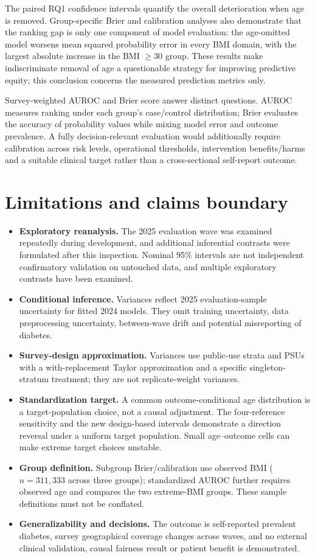 The paired RQ1 confidence intervals quantify the overall deterioration when age is removed. Group-specific Brier and calibration analyses also demonstrate that the ranking gap is only one component of model evaluation: the age-omitted model worsens mean squared probability error in every BMI domain, with the largest absolute increase in the BMI $\geq30$ group. These results make indiscriminate removal of age a questionable strategy for improving predictive equity; this conclusion concerns the measured prediction metrics only.

Survey-weighted AUROC and Brier score answer distinct questions. AUROC measures ranking under each group's case/control distribution; Brier evaluates the accuracy of probability values while mixing model error and outcome prevalence. A fully decision-relevant evaluation would additionally require calibration across risk levels, operational thresholds, intervention benefits/harms and a suitable clinical target rather than a cross-sectional self-report outcome.

\section{Limitations and claims boundary}
\begin{itemize}
\item \textbf{Exploratory reanalysis.} The 2025 evaluation wave was examined repeatedly during development, and additional inferential contrasts were formulated after this inspection. Nominal 95\% intervals are not independent confirmatory validation on untouched data, and multiple exploratory contrasts have been examined.
\item \textbf{Conditional inference.} Variances reflect 2025 evaluation-sample uncertainty for fitted 2024 models. They omit training uncertainty, data preprocessing uncertainty, between-wave drift and potential misreporting of diabetes.
\item \textbf{Survey-design approximation.} Variances use public-use strata and PSUs with a with-replacement Taylor approximation and a specific singleton-stratum treatment; they are not replicate-weight variances.
\item \textbf{Standardization target.} A common outcome-conditional age distribution is a target-population choice, not a causal adjustment. The four-reference sensitivity and the new design-based intervals demonstrate a direction reversal under a uniform target population. Small age--outcome cells can make extreme target choices unstable.
\item \textbf{Group definition.} Subgroup Brier/calibration use observed BMI ($n=311{,}333$ across three groups); standardized AUROC further requires observed age and compares the two extreme-BMI groups. These sample definitions must not be conflated.
\item \textbf{Generalizability and decisions.} The outcome is self-reported prevalent diabetes, survey geographical coverage changes across waves, and no external clinical validation, causal fairness result or patient benefit is demonstrated.
\end{itemize}

